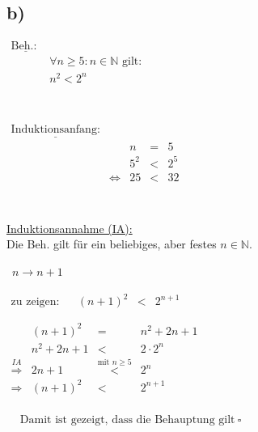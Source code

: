 \documentclass[a4paper]{scrartcl}
\newcommand{\qed}{\ \square}
\begin{document}
	\subsection{b)}
		\(		
		\begin{array}{lrcl}
			\underline{\text{Beh.: }}& \\
				&\forall n\geq 5:n\in\mathbb{N}\text{ gilt:} \\
				&n^2<2^n \\
		\end{array}
		\)\\ \\ \\
		\(
		\begin{array}{llrclcl}
			\underline{\text{Induktionsanfang:}}& \\
				&&n&=&5 \\
				&&5^2&<&2^5 \\
				&\Leftrightarrow &25&<&32 \\
		\end{array}
		\)\\ \\ \\
		\underline{Induktionsannahme (IA):}\\
		Die Beh. gilt für ein beliebiges, aber festes \(n\in\mathbb{N}\).\\ 
		\begin{flushleft}
			\underline{}\ \(n\rightarrow n+1\) \\
		\end{flushleft}
		\(
		\begin{array}{llrclclcl}
			\text{zu zeigen:} && (n+1)^2&<&2^{n+1} \\ \\
		\end{array}			
		\)\\ \(
		\begin{array}{lrclclcl}
			& (n+1)^2&=& n^2+2n+1\\
			& n^2+2n+1&<&2\cdot 2^n\\
			\overset{IA}{\Rightarrow} & 2n+1&\overset{\text{mit }n\geq 5}{<}&2^n \\
			\Rightarrow & (n+1)^2&<&2^{n+1}
			\end{array}			
		\)\\ \\ 
		\(
		\begin{array}{lcl}
			&\text{Damit ist gezeigt, dass die Behauptung gilt}\qed \\
		\end{array}
		\)
	
\end{document}
